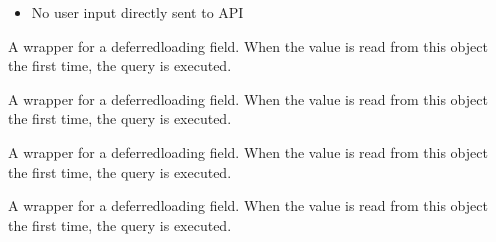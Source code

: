 \documentclass[letterpaper,10pt,english]{sphinxmanual}
\begin{document}
\begin{fulllineitems}
\begin{description}
\begin{itemize}
\item {} 
\sphinxAtStartPar
No user input directly sent to API

\end{itemize}

\end{description}

\begin{fulllineitems}
\label{\detokenize{index:bookings.models.MobileHome.name}}
\pysigstartsignatures
\pysigline
{}
\pysigstopsignatures
\sphinxAtStartPar
A wrapper for a deferred\sphinxhyphen{}loading field. When the value is read from this
object the first time, the query is executed.

\end{fulllineitems}


\begin{fulllineitems}
\label{\detokenize{index:bookings.models.MobileHome.name_en}}
\pysigstartsignatures
\pysigline
{}
\pysigstopsignatures
\sphinxAtStartPar
A wrapper for a deferred\sphinxhyphen{}loading field. When the value is read from this
object the first time, the query is executed.

\end{fulllineitems}


\begin{fulllineitems}
\label{\detokenize{index:bookings.models.MobileHome.name_es}}
\pysigstartsignatures
\pysigline
{}
\pysigstopsignatures
\sphinxAtStartPar
A wrapper for a deferred\sphinxhyphen{}loading field. When the value is read from this
object the first time, the query is executed.

\end{fulllineitems}


\begin{fulllineitems}
\label{\detokenize{index:bookings.models.MobileHome.name_de}}
\pysigstartsignatures
\pysigline
{}
\pysigstopsignatures
\sphinxAtStartPar
A wrapper for a deferred\sphinxhyphen{}loading field. When the value is read from this
object the first time, the query is executed.


\end{fulllineitems}
\end{fulllineitems}
\end{document}
